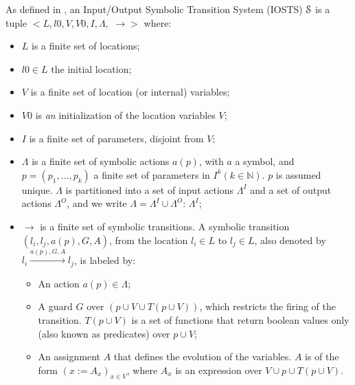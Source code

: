 \begin{definition}
    As defined in \cite{Rusu:2000:AST:647982.743536}, an
    Input/Output Symbolic Transition System (IOSTS)
    $\EuScript{S}$ is a tuple $<L,l0,V,V0,I,\Lambda,$
    $\rightarrow>$ where:

\begin{itemize}
    \item $L$ is a finite set of locations;

    \item $l0 \in L$ the initial location;

    \item $V$ is a finite set of location (or internal)
        variables;

    \item $V0$ is \emph{an} initialization of the location
        variables $V$;

    \item $I$ is a finite set of parameters, disjoint from $V$;

    \item $\Lambda$ is a finite set of symbolic actions $a(p)$,
        with $a$ a symbol, and $p = (p_1,\dots,p_k)$ a finite set
        of parameters in $I^k(k \in \mathbb{N})$. $p$ is assumed
        unique. $\Lambda$ is partitioned into a set of input
        actions $\Lambda^I$ and a set of output actions
        $\Lambda^O$, and we write $\Lambda = \Lambda^I \cup
        \Lambda^O$: $\Lambda^I$;

    \item $\rightarrow$ is a finite set of symbolic transitions.
        A symbolic transition $(l_i,l_j,a(p),G,A)$, from the
        location $l_i \in L$ to $l_j \in L$, also denoted by $l_i
        \xrightarrow{a(p),G,A} l_j$, is labeled by:

        \begin{itemize}
            \item An action $a(p) \in \Lambda$;

            \item A guard  $G$ over $(p \cup V \cup T(p \cup
                V))$, which restricts the firing of the
                transition. $T(p \cup V)$ is a set of functions
                that return boolean values only (also known as
                predicates) over $p \cup V$;

            \item An assignment $A$ that defines the evolution of
                the variables. $A$ is of the form $(x:=A_x)_{x\in
                V}$, where $A_x$ is an expression over $V \cup p
                \cup T(p \cup V)$.
        \end{itemize}
\end{itemize}
\end{definition}

